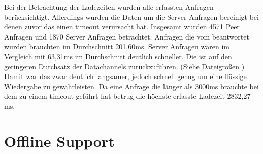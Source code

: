 Bei der Betrachtung der Ladezeiten wurden alle erfassten Anfragen berücksichtigt. Allerdings wurden die Daten um die Server Anfragen bereinigt bei denen zuvor das \pTp \cdn einen timeout verursacht hat. Insgesamt wurden 4571 Peer Anfragen und 1870 Server Anfragen betrachtet. 
Anfragen die vom \pTp \cdn beantwortet wurden brauchten im Durchschnitt 201,60ms. Server Anfragen waren im Vergleich mit 63,31ms im Durchschnitt deutlich schneller. Die ist auf den geringeren Durchsatz der \webrtc Datachannels zurückzuführen. (Siehe Dateigrößen ) Damit war das \pTp \cdn zwar deutlich langsamer, jedoch schnell genug um eine flüssige Wiedergabe zu gewährleisten. Da eine Anfrage die länger als 3000ms brauchte bei dem \pTp \cdn zu einem timeout geführt hat betrug die höchste erfasste Ladezeit 2832,27 ms.    


\section{Offline Support}

